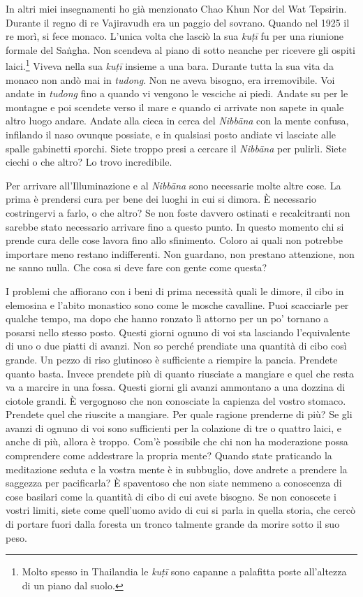 In altri miei insegnamenti ho già menzionato Chao Khun Nor del Wat
Tepsirin. Durante il regno di re Vajiravudh era un paggio del sovrano.
Quando nel 1925 il re morì, si fece monaco. L'unica volta che lasciò la
sua \emph{kuṭī} fu per una riunione formale del Saṅgha. Non scendeva al
piano di sotto neanche per ricevere gli ospiti laici.\footnote{Molto
  spesso in Thailandia le \emph{kuṭī} sono capanne a palafitta poste
  all'altezza di un piano dal suolo.} Viveva nella sua \emph{kuṭī}
insieme a una bara. Durante tutta la sua vita da monaco non andò mai in
\emph{tudong}. Non ne aveva bisogno, era irremovibile. Voi andate in
\emph{tudong} fino a quando vi vengono le vesciche ai piedi. Andate su
per le montagne e poi scendete verso il mare e quando ci arrivate non
sapete in quale altro luogo andare. Andate alla cieca in cerca del
\emph{Nibbāna} con la mente confusa, infilando il naso ovunque possiate,
e in qualsiasi posto andiate vi lasciate alle spalle gabinetti sporchi.
Siete troppo presi a cercare il \emph{Nibbāna} per pulirli. Siete ciechi
o che altro? Lo trovo incredibile.

Per arrivare all'Illuminazione e al \emph{Nibbāna} sono necessarie molte
altre cose. La prima è prendersi cura per bene dei luoghi in cui si
dimora. È necessario costringervi a farlo, o che altro? Se non foste
davvero ostinati e recalcitranti non sarebbe stato necessario arrivare
fino a questo punto. In questo momento chi si prende cura delle cose
lavora fino allo sfinimento. Coloro ai quali non potrebbe importare meno
restano indifferenti. Non guardano, non prestano attenzione, non ne
sanno nulla. Che cosa si deve fare con gente come questa?

I problemi che affiorano con i beni di prima necessità quali le dimore,
il cibo in elemosina e l'abito monastico sono come le mosche cavalline.
Puoi scacciarle per qualche tempo, ma dopo che hanno ronzato lì attorno
per un po' tornano a posarsi nello stesso posto. Questi giorni ognuno di
voi sta lasciando l'equivalente di uno o due piatti di avanzi. Non so
perché prendiate una quantità di cibo così grande. Un pezzo di riso
glutinoso è sufficiente a riempire la pancia. Prendete quanto basta.
Invece prendete più di quanto riusciate a mangiare e quel che resta va a
marcire in una fossa. Questi giorni gli avanzi ammontano a una dozzina
di ciotole grandi. È vergognoso che non conosciate la capienza del
vostro stomaco. Prendete quel che riuscite a mangiare. Per quale ragione
prenderne di più? Se gli avanzi di ognuno di voi sono sufficienti per la
colazione di tre o quattro laici, e anche di più, allora è troppo. Com'è
possibile che chi non ha moderazione possa comprendere come addestrare
la propria mente? Quando state praticando la meditazione seduta e la
vostra mente è in subbuglio, dove andrete a prendere la saggezza per
pacificarla? È spaventoso che non siate nemmeno a conoscenza di cose
basilari come la quantità di cibo di cui avete bisogno. Se non conoscete
i vostri limiti, siete come quell'uomo avido di cui si parla in quella
storia, che cercò di portare fuori dalla foresta un tronco talmente
grande da morire sotto il suo peso.

